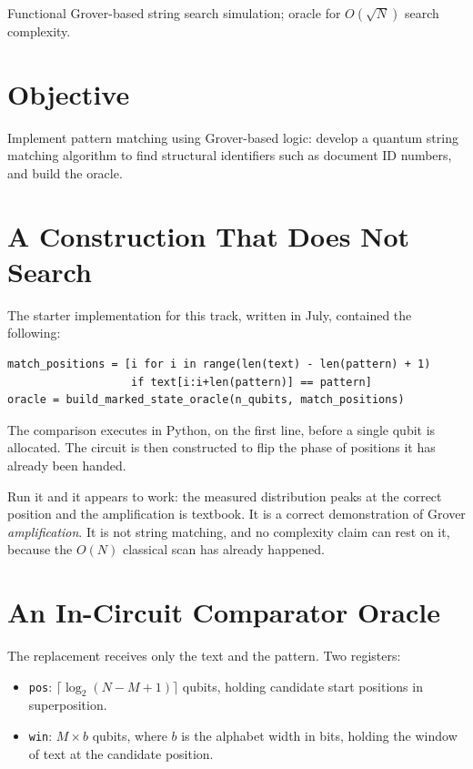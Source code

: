 \documentclass[11pt,a4paper]{article}
\begin{document}
{Functional Grover-based string search simulation; oracle for $O(\sqrt{N})$ search complexity.}

\section{Objective}

Implement pattern matching using Grover-based logic: develop a quantum string
matching algorithm to find structural identifiers such as document ID numbers,
and build the oracle.

\section{A Construction That Does Not Search}

The starter implementation for this track, written in July, contained the
following:

\begin{lstlisting}
match_positions = [i for i in range(len(text) - len(pattern) + 1)
                   if text[i:i+len(pattern)] == pattern]
oracle = build_marked_state_oracle(n_qubits, match_positions)
\end{lstlisting}

The comparison executes in Python, on the first line, before a single qubit is
allocated. The circuit is then constructed to flip the phase of positions it has
already been handed.

Run it and it appears to work: the measured distribution peaks at the correct
position and the amplification is textbook. It is a correct demonstration of
Grover \emph{amplification}. It is not string matching, and no complexity claim
can rest on it, because the $O(N)$ classical scan has already happened.


\section{An In-Circuit Comparator Oracle}

The replacement receives only the text and the pattern. Two registers:

\begin{itemize}
\item \texttt{pos}: $\lceil\log_2(N-M+1)\rceil$ qubits, holding candidate start
      positions in superposition.
\item \texttt{win}: $M \times b$ qubits, where $b$ is the alphabet width in
      bits, holding the window of text at the candidate position.
\end{itemize}
\end{document}
